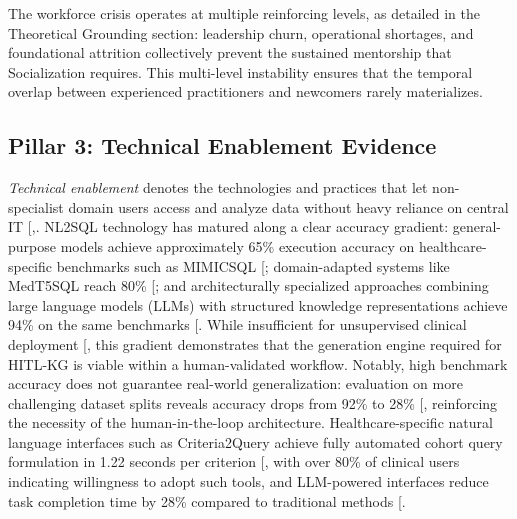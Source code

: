 \documentclass[
  american,
  11pt,
  letterpaper,
  oneside  ,captions=tableheading
]{scrartcl}
\begin{document}
The workforce crisis operates at multiple reinforcing levels, as
detailed in the Theoretical Grounding section: leadership churn,
operational shortages, and foundational attrition collectively prevent
the sustained mentorship that Socialization requires. This multi-level
instability ensures that the temporal overlap between experienced
practitioners and newcomers rarely materializes.

\subsection{Pillar 3: Technical Enablement
Evidence}\label{pillar-3-technical-enablement-evidence}

\emph{Technical enablement} denotes the technologies and practices that
let non-specialist domain users access and analyze data without heavy
reliance on central IT
{[},\citeproc{ref-banihani2020}{56}{]}.
NL2SQL technology has matured along a clear accuracy gradient:
general-purpose models achieve approximately 65\% execution accuracy on
healthcare-specific benchmarks such as MIMICSQL
{[}\citeproc{ref-blaskovic2025}{57}{]}; domain-adapted systems like
MedT5SQL reach 80\% {[}\citeproc{ref-marshan2024}{58}{]}; and
architecturally specialized approaches combining large language models
(LLMs) with structured knowledge representations achieve 94\% on the
same benchmarks {[}\citeproc{ref-chen2026graph}{59}{]}. While
insufficient for unsupervised clinical deployment
{[}\citeproc{ref-ziletti2024}{37}{]}, this gradient demonstrates that
the generation engine required for HITL-KG is viable within a
human-validated workflow. Notably, high benchmark accuracy does not
guarantee real-world generalization: evaluation on more challenging
dataset splits reveals accuracy drops from 92\% to 28\%
{[}\citeproc{ref-tarbell2024}{60}{]}, reinforcing the necessity of the
human-in-the-loop architecture. Healthcare-specific natural language
interfaces such as Criteria2Query achieve fully automated cohort query
formulation in 1.22 seconds per criterion
{[}\citeproc{ref-yuan2019}{61}{]}, with over 80\% of clinical users
indicating willingness to adopt such tools, and LLM-powered interfaces
reduce task completion time by 28\% compared to traditional methods
{[}\citeproc{ref-nittala2024}{62}{]}.
\end{document}
